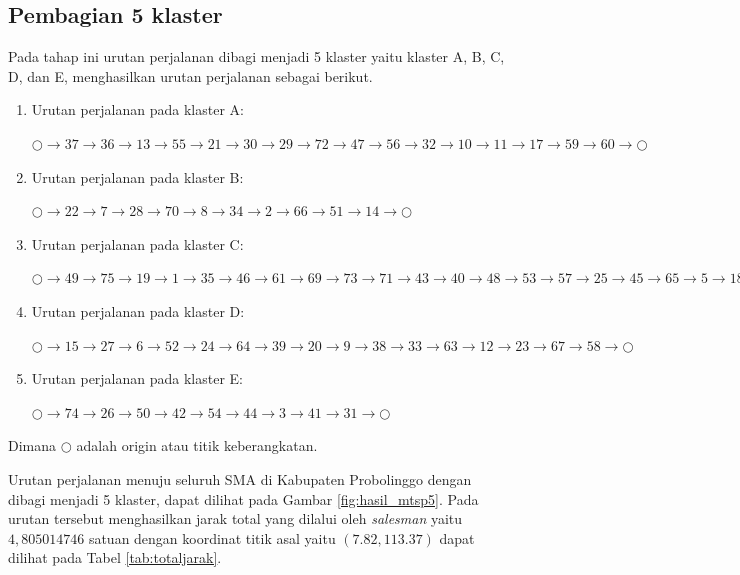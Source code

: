 \subsection{Pembagian 5 klaster}

Pada tahap ini urutan perjalanan dibagi menjadi 5 klaster yaitu klaster A, B, C, D, dan E, menghasilkan urutan perjalanan sebagai berikut.

\begin{enumerate}

\item Urutan perjalanan pada klaster A:

$\bigcirc \to 37 \to 36 \to 13 \to 55 \to 21 \to 30 \to 29 \to 72 \to 47 \to 56 \to 32 \to 10 \to 11 \to 17 \to 59 \to 60 \to \bigcirc$

\item Urutan perjalanan pada klaster B:

$\bigcirc \to 22 \to 7 \to 28 \to 70 \to 8 \to 34 \to 2 \to 66 \to 51 \to 14 \to \bigcirc$

\item Urutan perjalanan pada klaster C:

$\bigcirc \to 49 \to 75 \to 19 \to 1 \to 35 \to 46 \to 61 \to 69 \to 73 \to 71 \to 43 \to 40 \to 48 \to 53 \to 57 \to 25 \to 45 \to 65 \to 5 \to 18 \to 68 \to 16 \to 4 \to 62 \to \bigcirc$

\item Urutan perjalanan pada klaster D:

$\bigcirc \to 15 \to 27 \to 6 \to 52 \to 24 \to 64 \to 39 \to 20 \to 9 \to 38 \to 33 \to 63 \to 12 \to 23 \to 67 \to 58 \to \bigcirc$

\item Urutan perjalanan pada klaster E:

$\bigcirc \to 74 \to 26 \to 50 \to 42 \to 54 \to 44 \to 3 \to 41 \to 31 \to \bigcirc$

\end{enumerate}

\noindent Dimana $\bigcirc$ adalah origin atau titik keberangkatan.

Urutan perjalanan menuju seluruh SMA di Kabupaten Probolinggo dengan dibagi menjadi 5 klaster, dapat dilihat pada Gambar \ref{fig:hasil_mtsp5}. Pada urutan tersebut menghasilkan jarak total yang dilalui oleh \textit{salesman} yaitu $4,805014746$ satuan dengan koordinat titik asal yaitu $(7.82, 113.37)$ dapat dilihat pada Tabel \ref{tab:totaljarak}.

